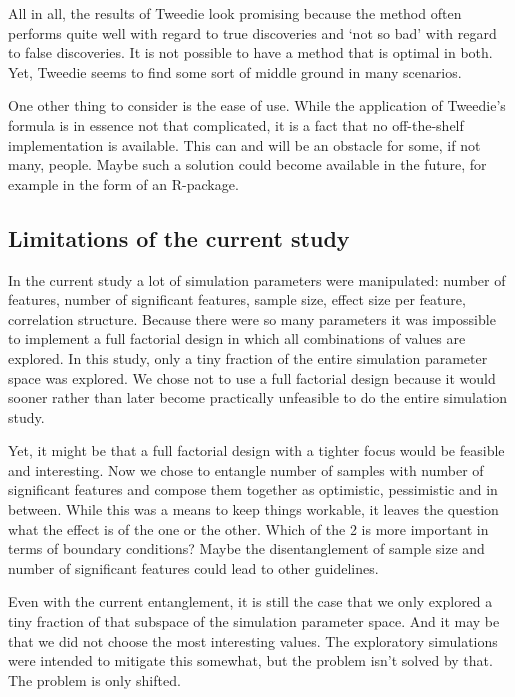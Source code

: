 \documentclass[
]{article}
\begin{document}
All in all, the results of Tweedie look promising because the method often performs quite well with regard to true discoveries and `not so bad' with regard to false discoveries. It is not possible to have a method that is optimal in both. Yet, Tweedie seems to find some sort of middle ground in many scenarios.

One other thing to consider is the ease of use. While the application of Tweedie's formula is in essence not that complicated, it is a fact that no off-the-shelf implementation is available. This can and will be an obstacle for some, if not many, people. Maybe such a solution could become available in the future, for example in the form of an R-package.

\hypertarget{limitations-of-the-current-study}{%
\subsection{Limitations of the current study}\label{limitations-of-the-current-study}}

In the current study a lot of simulation parameters were manipulated: number of features, number of significant features, sample size, effect size per feature, correlation structure. Because there were so many parameters it was impossible to implement a full factorial design in which all combinations of values are explored. In this study, only a tiny fraction of the entire simulation parameter space was explored. We chose not to use a full factorial design because it would sooner rather than later become practically unfeasible to do the entire simulation study.

Yet, it might be that a full factorial design with a tighter focus would be feasible and interesting. Now we chose to entangle number of samples with number of significant features and compose them together as optimistic, pessimistic and in between. While this was a means to keep things workable, it leaves the question what the effect is of the one or the other. Which of the 2 is more important in terms of boundary conditions? Maybe the disentanglement of sample size and number of significant features could lead to other guidelines.

Even with the current entanglement, it is still the case that we only explored a tiny fraction of that subspace of the simulation parameter space. And it may be that we did not choose the most interesting values. The exploratory simulations were intended to mitigate this somewhat, but the problem isn't solved by that. The problem is only shifted.
\end{document}
